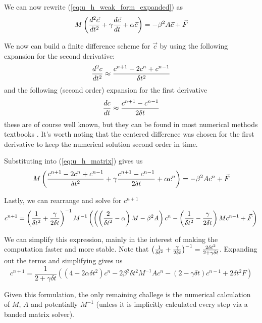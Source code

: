 We can now rewrite (\ref{eq:u_h_weak_form_expanded}) as
\begin{equation} \label{eq:u_h_matrix}
M\left( \frac{d^2 \vec{c}}{d t^2} + \gamma\frac{d \vec{c}}{d t} + \alpha \vec{c} \right) = - \beta^2 A \vec{c} + \vec{F}
\end{equation}

We now can build a finite difference scheme for $\vec{c}$ by using the following expansion for the second derivative:
\begin{equation} \label{eq:second_derivative_finite_difference}
\frac{d^2 c}{d t^2} \approx \frac{c^{n+1} - 2c^n + c^{n-1}}{\delta t^2}
\end{equation}
and the following (second order) expansion for the first derivative
\begin{equation} \label{eq:first_derivative_finite_difference}
\frac{d c}{d t} \approx \frac{c^{n+1} - c^{n-1}}{2\delta t}
\end{equation}
these are of course well known, but they can be found in most numerical methods textbooks \cite{difference_formulas}.
It's worth noting that the centered difference was chosen for the first derivative to keep the numerical solution second
order in time.

Substituting into (\ref{eq:u_h_matrix}) gives us
\begin{equation} \label{eq:finite_diff_weak_form}
M \left( \frac{c^{n+1} - 2c^n + c^{n-1}}{\delta t^2} + \gamma \frac{c^{n+1} - c^{n-1}}{2\delta t} + \alpha c^n \right) = - \beta^2 A c^n + \vec{F}
\end{equation}

Lastly, we can rearrange and solve for $c^{n+1}$
\begin{equation} \label{eq:finite_diff_solution}
c^{n+1} = \left( \frac{1}{\delta t^2} + \frac{\gamma}{2\delta t} \right)^{-1} M^{-1}
\left(
\left( \left(\frac{2}{\delta t^2} - \alpha\right) M - \beta^2 A \right) c^n
-
\left( \frac{1}{\delta t^2} - \frac{\gamma}{2\delta t} \right) M c^{n-1}
+
\vec{F}
\right)
\end{equation}

We can simplify this expression, mainly in the interest of making the computation faster and more stable. Note
that $\left( \frac{1}{\delta t^2} + \frac{\gamma}{2\delta t} \right)^{-1} = \frac{2\delta t^2}{2 + \gamma\delta t}$. Expanding out the terms and simplifying gives us
\begin{equation}
c^{n+1}
=
\frac{1}{2 + \gamma\delta t} \left(
(4 - 2\alpha\delta t^2)c^n  - 2\beta^2\delta t^2M^{-1}Ac^n
- (2 - \gamma\delta t)c^{n-1}
+ 2\delta t^2 F
\right)
\end{equation}

Given this formulation, the only remaining challege is the numerical calculation of $M$, $A$ and potentially
$M^{-1}$ (unless it is implicitly calculated every step via a banded matrix solver).
